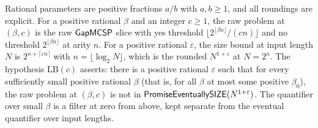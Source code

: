 \begin{definition}
  \label{def:meta-magnification-params}
  \leanok
  Rational parameters are positive fractions $a/b$ with $a, b \ge 1$, and all
  roundings are explicit. For a positive rational $\beta$ and an integer
  $c \ge 1$, the raw problem at $(\beta, c)$ is the raw $\mathsf{GapMCSP}$ slice
  with yes threshold $\lfloor 2^{\lfloor \beta n \rfloor}/(cn) \rfloor$ and no
  threshold $2^{\lfloor \beta n \rfloor}$ at arity $n$. For a positive
  rational $\varepsilon$, the size bound at input length $N$ is
  $2^{n + \lceil \varepsilon n \rceil}$ with $n = \lfloor \log_2 N \rfloor$,
  which is the rounded $N^{1+\varepsilon}$ at $N = 2^n$. The hypothesis
  $\mathrm{LB}(c)$ asserts: there is a positive rational $\varepsilon$ such
  that for every sufficiently small positive rational $\beta$ (that is, for
  all $\beta$ at most some positive $\beta_0$), the raw problem at
  $(\beta, c)$ is not in $\mathsf{PromiseEventuallySIZE}(N^{1+\varepsilon})$. The
  quantifier over small $\beta$ is a filter at zero from above, kept separate
  from the eventual quantifier over input lengths.
\end{definition}

